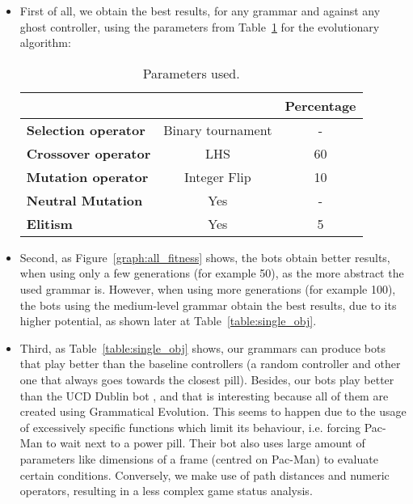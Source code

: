 \begin{itemize}
\item First of all, we obtain the best results, for any grammar and against any ghost controller, using the parameters from Table~\ref{table:best-params-en} for the evolutionary algorithm:
\begin{table}[H]
\centering
\begin{tabular}{lc|c|}
\cline{3-3}
                                                   &                                                               & \textbf{Percentage} \\ \hline
\multicolumn{1}{|l|}{\textbf{Selection operator}} & Binary tournament \footnotemark & -                   \\ \hline
\multicolumn{1}{|l|}{\textbf{Crossover operator}}     & LHS                                                           & 60                  \\ \hline
\multicolumn{1}{|l|}{\textbf{Mutation operator}}  & Integer Flip                                                  & 10                  \\ \hline
\multicolumn{1}{|l|}{\textbf{Neutral Mutation}}    & Yes                                                            & -                   \\ \hline
\multicolumn{1}{|l|}{\textbf{Elitism}}            & Yes                                                            & 5                   \\ \hline
\end{tabular}
\label{table:best-params-en}
\caption{Parameters used.}
\end{table}

\item Second, as Figure~\ref{graph:all_fitness} shows, the bots obtain better results, when using only a few generations (for example 50), as the more abstract the used grammar is. However, when using more generations (for example 100), the bots using the medium-level grammar obtain the best results, due to its higher potential, as shown later at Table~\ref{table:single_obj}.

\item Third, as Table~\ref{table:single_obj} shows, our grammars can produce bots that play better than the baseline controllers (a random controller and other one that always goes towards the closest pill). Besides, our bots play better than the UCD Dublin bot \cite{galvan2010evolving}, and that is interesting because all of them are created using Grammatical Evolution. This seems to happen due to the usage of excessively specific functions which limit its behaviour, i.e. forcing Pac-Man to wait next to a power pill. Their bot also uses large amount of parameters like dimensions of a frame (centred on Pac-Man) to evaluate certain conditions. Conversely, we make use of path distances and numeric operators, resulting in a less complex game status analysis.
\end{itemize}

